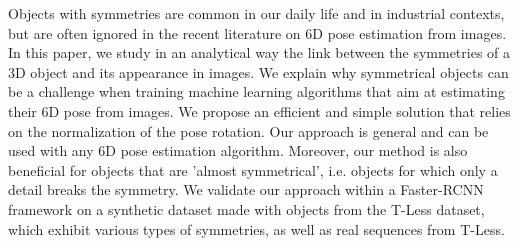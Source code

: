 Objects with symmetries are common in our daily life and in industrial contexts, but are often ignored in the recent literature on 6D pose estimation from images. In this paper, we study in an analytical way the link between the symmetries of a 3D object and its appearance in images. We explain why symmetrical objects can be a challenge when training machine learning algorithms that aim at estimating their 6D pose from images. We propose an efficient and simple solution that relies on the normalization of the pose rotation. Our approach is general and can be used with any 6D pose estimation algorithm. Moreover, our method is also beneficial for objects that are 'almost symmetrical', i.e. objects for which only a detail breaks the symmetry. We validate our approach within a Faster-RCNN framework on a synthetic dataset made with objects from the T-Less dataset, which exhibit various types of symmetries, as well as real sequences from T-Less.

